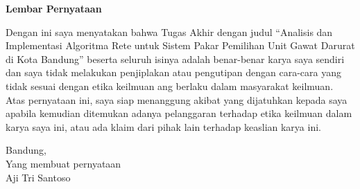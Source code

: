 {\centering
\textbf{\large Lembar Pernyataan}\\
\vspace{1 cm}

}
Dengan ini saya menyatakan bahwa Tugas Akhir dengan judul “Analisis dan Implementasi Algoritma Rete untuk Sistem Pakar Pemilihan Unit Gawat Darurat di Kota Bandung” beserta seluruh isinya adalah benar-benar karya saya sendiri dan saya tidak melakukan penjiplakan atau pengutipan dengan cara-cara yang tidak sesuai dengan etika keilmuan ang berlaku dalam masyarakat keilmuan. Atas pernyataan ini, saya siap menanggung akibat yang dijatuhkan kepada saya apabila kemudian ditemukan adanya pelanggaran terhadap etika keilmuan dalam karya saya ini, atau ada klaim dari pihak lain terhadap keaslian karya ini.
\vspace{1 cm}

\setlength{\parindent}{45ex}
{Bandung, \Tanggal\quad \Bulan \quad \Date}\\

\setlength{\parindent}{45ex}
Yang membuat pernyataan\\
	
\vspace{1.25 cm}
\setlength{\parindent}{45ex}
Aji Tri Santoso\\
	



